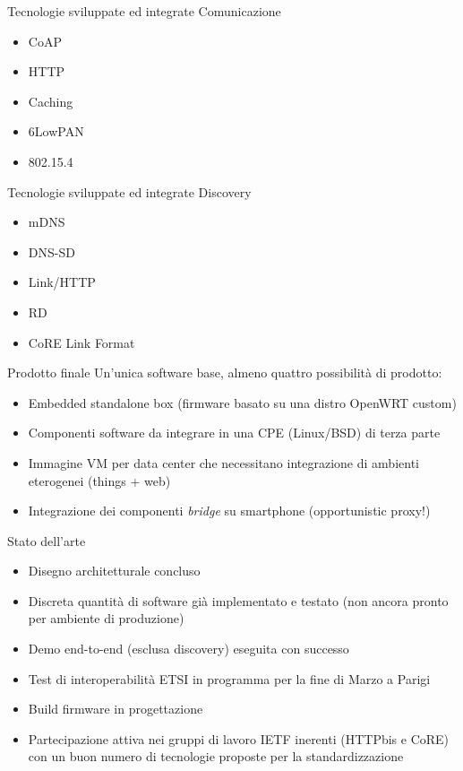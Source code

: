 \documentclass{beamer}
\begin{document}
\begin{frame}{Tecnologie sviluppate ed integrate}
Comunicazione
\begin{itemize}
  \pause
  \item CoAP
  \pause
  \item HTTP
  \pause
  \item Caching
  \pause
  \item 6LowPAN
  \pause
  \item 802.15.4
\end{itemize}
\end{frame}

\begin{frame}{Tecnologie sviluppate ed integrate}
Discovery
\begin{itemize}
  \pause
  \item mDNS
  \pause
  \item DNS-SD
  \pause
  \item Link/HTTP
  \pause
  \item RD
  \pause
  \item CoRE Link Format
\end{itemize}
\end{frame}

\begin{frame}{Prodotto finale}
Un'unica software base, almeno quattro possibilit\`a di prodotto:
\begin{itemize}
  \pause
  \item Embedded standalone box (firmware basato su una distro OpenWRT custom)
  \pause
  \item Componenti software da integrare in una CPE (Linux/BSD) di terza parte
  \pause
  \item Immagine VM per data center che necessitano integrazione di ambienti eterogenei (things + web)
  \pause
  \item Integrazione dei componenti \emph{bridge} su smartphone (opportunistic proxy!)
\end{itemize}
\end{frame}

\begin{frame}{Stato dell'arte}
\begin{itemize}
  \pause
  \item Disegno architetturale concluso
  \pause
  \item Discreta quantit\`a di software gi\`a implementato e testato (non ancora pronto per ambiente di produzione)
  \pause
  \item Demo end-to-end (esclusa discovery) eseguita con successo
  \pause
  \item Test di interoperabilit\`a ETSI in programma per la fine di Marzo a Parigi
  \pause
  \item Build firmware in progettazione
  \pause
  \item Partecipazione attiva nei gruppi di lavoro IETF inerenti (HTTPbis e CoRE) con un buon numero di tecnologie proposte per la standardizzazione
\end{itemize}
\end{frame}
\end{document}
